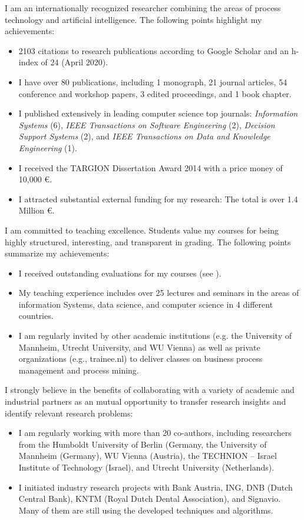 I am an internationally recognized researcher combining the areas of process technology and artificial intelligence.  The following points highlight my achievements:
\begin{itemize}[noitemsep,topsep=2pt]
\item 2103 citations to research publications according to Google Scholar and an h-index of 24 (April 2020). 
\item I have over 80 publications, including 1 monograph, 21 journal articles, 54 conference and workshop papers, 3 edited proceedings, and 1 book chapter. 
\item I published extensively in leading computer science top journals: \textit{Information Systems} (6), \textit{IEEE Transactions on Software Engineering} (2), \textit{Decision Support Systems} (2), and \textit{IEEE Transactions on Data and Knowledge Engineering} (1).
\item I received the TARGION Dissertation Award 2014 with a price money of 10,000 \euro. 
\item I attracted substantial external funding for my research: The total is over 1.4 Million \euro.
\end{itemize}

\vspace{0.5cm}

\noindent I  am committed to teaching excellence. Students value my courses for being highly structured, interesting, and transparent in grading. The following points summarize my achievements:
\begin{itemize}[noitemsep,topsep=2pt]
\item I received outstanding evaluations for my courses (see ).
\item My teaching experience includes over 25 lectures and seminars in the areas of information Systems, data science, and computer science in 4 different countries. 
\item I am regularly invited by other academic institutions (e.g. the University of Mannheim, Utrecht University, and WU Vienna) as well as private organizations (e.g., trainee.nl) to deliver classes on business process management and process mining.
\end{itemize}

\vspace{0.5cm}
\noindent I strongly believe in the benefits of collaborating with a variety of academic and industrial partners as an mutual opportunity to transfer research insights and identify relevant research problems:
\begin{itemize}[noitemsep,topsep=2pt]
\item I am regularly working with more than 20 co-authors, including researchers from the Humboldt University of Berlin (Germany, the University of Mannheim (Germany), WU Vienna (Austria), the TECHNION – Israel Institute of Technology (Israel), and Utrecht University (Netherlands).
\item I initiated industry research projects with Bank Austria, ING, DNB (Dutch Central Bank), KNTM (Royal Dutch Dental Association), and Signavio.  Many  of them are still using the developed techniques and algorithms. 
\end{itemize}